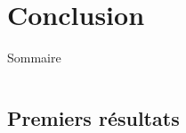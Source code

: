\documentclass[9pt]{beamer}
\begin{document}
\section{Conclusion}

\begin{frame}{Sommaire}
	\begin{columns}[onlytextwidth,T]
        \begin{column}{.45\textwidth}
            \tableofcontents[currentsection, sections=1-2]
        \end{column}
        \begin{column}{.45\textwidth}
            \tableofcontents[currentsection, sections=3-5]
        \end{column}
    \end{columns}
\end{frame}


\subsection{Premiers résultats}
\end{document}
